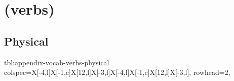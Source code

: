 \documentclass[../nihongo-gakushuu-kyouzai-vocabulary.tex]{subfiles}
\begin{document}
\appendix
\setcounter{section}{3}

\section{ (verbs)} \label{appendix:verbs}


\subsection{Physical}
{tbl:appendix-vocab-verbs-physical}  %
{}  %
{
    colspec={X[-4,l]X[-1,c]X[12,l]X[-3,l]X[-4,l]X[-1,c]X[12,l]X[-3,l]},
    rowhead=2,
}  %
\end{document}
